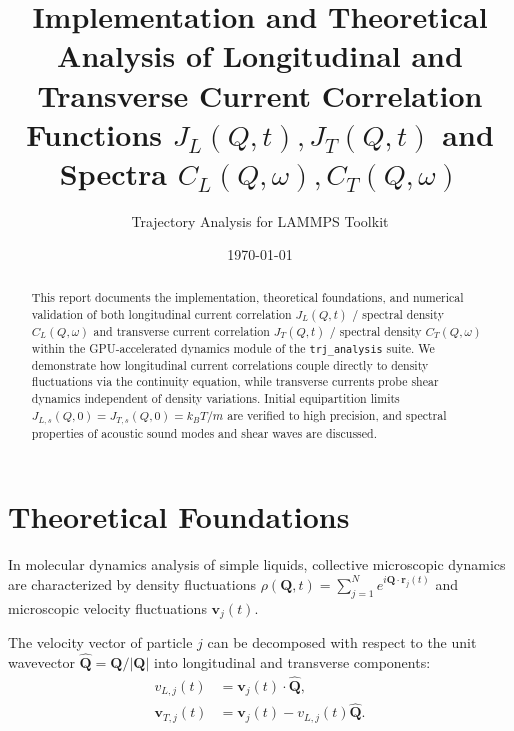 \documentclass[11pt,a4paper]{article}
\title{\textbf{Implementation and Theoretical Analysis of Longitudinal and Transverse Current Correlation Functions $J_L(Q,t), J_T(Q,t)$ and Spectra $C_L(Q,\omega), C_T(Q,\omega)$}}
\author{Trajectory Analysis for LAMMPS Toolkit}
\date{\today}
\begin{document}
\maketitle

\begin{abstract}
This report documents the implementation, theoretical foundations, and numerical validation of both longitudinal current correlation $J_L(Q,t)$ / spectral density $C_L(Q,\omega)$ and transverse current correlation $J_T(Q,t)$ / spectral density $C_T(Q,\omega)$ within the GPU-accelerated dynamics module of the \texttt{trj\_analysis} suite. We demonstrate how longitudinal current correlations couple directly to density fluctuations via the continuity equation, while transverse currents probe shear dynamics independent of density variations. Initial equipartition limits $J_{L,s}(Q,0) = J_{T,s}(Q,0) = k_B T/m$ are verified to high precision, and spectral properties of acoustic sound modes and shear waves are discussed.
\end{abstract}

\section{Theoretical Foundations}

In molecular dynamics analysis of simple liquids, collective microscopic dynamics are characterized by density fluctuations $\rho(\mathbf{Q},t) = \sum_{j=1}^N e^{i \mathbf{Q} \cdot \mathbf{r}_j(t)}$ and microscopic velocity fluctuations $\mathbf{v}_j(t)$.

The velocity vector of particle $j$ can be decomposed with respect to the unit wavevector $\hat{\mathbf{Q}} = \mathbf{Q}/|\mathbf{Q}|$ into longitudinal and transverse components:
\begin{align}
v_{L,j}(t) &= \mathbf{v}_j(t) \cdot \hat{\mathbf{Q}}, \\
\mathbf{v}_{T,j}(t) &= \mathbf{v}_j(t) - v_{L,j}(t) \hat{\mathbf{Q}}.
\end{align}
\end{document}
